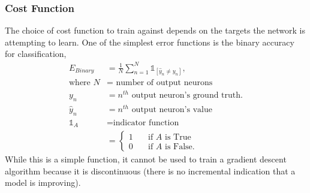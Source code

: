 


\subsubsection{Cost Function}

The choice of cost function to train against depends on the targets the network is attempting to learn. One of the simplest error functions is the binary accuracy for classification, 
%
\begin{align} \label{eq:Binary_accuracy}
E_{Binary} &= {\frac{1} N} \sum_{n=1}^N \mathds{1}_[\hat{y}_n \neq y_n ], \\
\text{where } N &= \text{ number of output neurons} \nonumber \\
y_n &= n^{th} \text{ output neuron's ground truth.} \nonumber \\
\hat{y}_n &= n^{th} \text{ output neuron's value} \nonumber \\
\mathds{1}_A &= \text{indicator function} \nonumber \\
&= \nonumber
	\begin{cases}
	1  & \quad \text{if } A \text{ is True}\\
	0  & \quad \text{if } A \text{ is False.}
	\end{cases} \nonumber
\end{align}
While this is a simple function, it cannot be used to train a gradient descent algorithm because it is discontinuous (there is no incremental indication that a model is improving).

